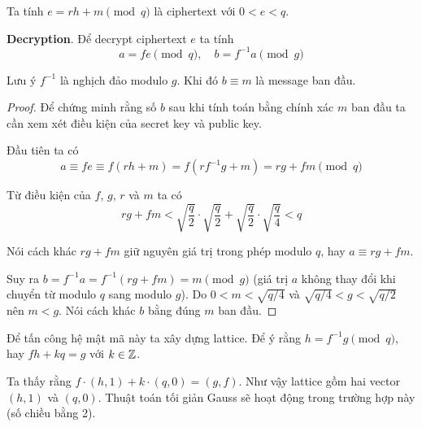 Ta tính $e = rh + m \pmod q$ là ciphertext với $0 < e < q$.

\textbf{Decryption}. Để decrypt ciphertext $e$ ta tính \[ a = fe \pmod q, \quad b = f^{-1} a \pmod g \]

Lưu ý $f^{-1}$ là nghịch đảo modulo $g$. Khi đó $b \equiv m$ là message ban đầu.

\begin{proof}
    Để chứng minh rằng số $b$ sau khi tính toán bằng chính xác $m$ ban đầu ta cần xem xét điều kiện của secret key và public key.

    Đầu tiên ta có \[ a \equiv fe \equiv f(rh + m) = f(r f^{-1} g + m) = rg + fm \pmod q \]

    Từ điều kiện của $f$, $g$, $r$ và $m$ ta có \[ rg + fm < \sqrt{\dfrac{q}{2}} \cdot \sqrt{\dfrac{q}{2}} + \sqrt{\dfrac{q}{2}} \cdot \sqrt{\dfrac{q}{4}} < q \]

    Nói cách khác $rg + fm$ giữ nguyên giá trị trong phép modulo $q$, hay $a \equiv rg + fm$.

    Suy ra $b = f^{-1} a = f^{-1} (rg + fm) = m \pmod g$ (giá trị $a$ không thay đổi khi chuyển từ modulo $q$ sang modulo $g$). Do $0 < m < \sqrt{q/4}$ và $\sqrt{q/4} < g < \sqrt{q/2}$ nên $m < g$. Nói cách khác $b$ bằng đúng $m$ ban đầu.
\end{proof}

Để tấn công hệ mật mã này ta xây dựng lattice. Để ý rằng $h = f^{-1} g \pmod q$, hay $fh + kq = g$ với $k \in \mathbb{Z}$.

Ta thấy rằng $f \cdot (h, 1) + k \cdot (q, 0) = (g, f)$. Như vậy lattice gồm hai vector $(h, 1)$ và $(q, 0)$. Thuật toán tối giản Gauss sẽ hoạt động trong trường hợp này (số chiều bằng 2).
